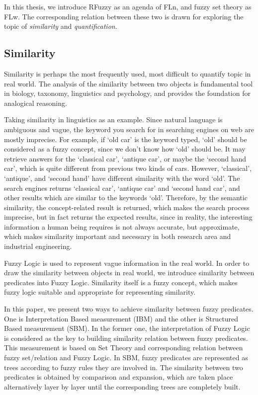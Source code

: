 \documentclass[Thesis.tex]{subfiles}
\begin{document}
In this thesis, we introduce RFuzzy as an agenda of FLn, and fuzzy set theory as FLw. The corresponding relation between these two is drawn for exploring the topic of \textit{similarity} and \textit{quantification}.
 
\subsection{Similarity}
Similarity is perhaps the most frequently used, most difficult to quantify topic in real world. The analysis of the similarity between two objects is fundamental tool in biology, taxonomy, linguistics and psychology, and provides the foundation for analogical reasoning. 

Taking similarity in linguistics as an example. Since natural language is ambiguous and vague, the keyword you search for in searching engines on web are mostly imprecise. For example, if `old car' is the keyword typed, `old' should be considered as a fuzzy concept, since we don't know how `old' should be. It may retrieve answers for the `classical car', `antique car', or maybe the `second hand car', which is quite different from previous two kinds of cars. However, `classical', `antique', and `second hand' have different similarity with the word `old'. The search engines returns `classical car', `antique car' and `second hand car', and other results which are similar to the keywords `old'. Therefore, by the semantic similarity, the concept-related result is returned, which makes the search process imprecise, but in fact returns the expected results, since in reality, the interesting information a human being requires is not always accurate, but approximate, which makes similarity important and necessary in both research area and industrial engineering. 

Fuzzy Logic is used to represent vague information in the real world. In order to draw the similarity between objects in real world, we introduce similarity between predicates into Fuzzy Logic. Similarity itself is a fuzzy concept, which makes fuzzy logic suitable and appropriate for representing similarity. 

In this paper, we present two ways to achieve similarity between fuzzy predicates. One is Interpretation Based measurement (IBM) and the other is Structured Based measurement (SBM). In the former one,  the interpretation of Fuzzy Logic is considered as the key to building similarity relation between fuzzy predicates. This measurement is based on Set Theory and corresponding relation between fuzzy set/relation and Fuzzy Logic. In SBM, fuzzy predicates are represented as trees according to fuzzy rules they are involved in. The similarity between two predicates is obtained by comparison and expansion, which are taken place alternatively layer by layer until the corresponding trees are completely built. 
\end{document}
